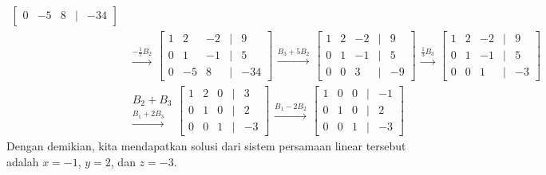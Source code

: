 \documentclass[11pt,a4paper]{article}
\begin{document}
\begin{enumerate}
\begin{align*}
\begin{bmatrix}
              0 & -5 & 8 & | & -34
          \end{bmatrix}\\
          &\begin{matrix}
            \xrightarrow{-\frac{1}{7}B_2}
          \end{matrix}
          \begin{bmatrix}
              1 & 2 & -2 & | & 9 \\
              0 & 1 & -1 & | & 5 \\
              0 & -5 & 8 & | & -34
          \end{bmatrix}
          \begin{matrix}
              \xrightarrow{B_3 + 5B_2}
          \end{matrix}
          \begin{bmatrix}
              1 & 2 & -2 & | & 9 \\
              0 & 1 & -1 & | & 5 \\
              0 & 0 & 3 & | & -9
          \end{bmatrix}
          \begin{matrix}
              \xrightarrow{\frac{1}{3}B_3}
          \end{matrix}
          \begin{bmatrix}
              1 & 2 & -2 & | & 9 \\
              0 & 1 & -1 & | & 5 \\
              0 & 0 & 1 & | & -3
          \end{bmatrix}\\
          &\begin{matrix}
              {\scriptstyle B_2 + B_3}\\
              \xrightarrow{B_1 + 2B_3}
          \end{matrix}
          \begin{bmatrix}
              1 & 2 & 0 & | & 3 \\
              0 & 1 & 0 & | & 2 \\
              0 & 0 & 1 & | & -3
          \end{bmatrix}
          \begin{matrix}
              \xrightarrow{B_1-2B_2}
          \end{matrix}
          \begin{bmatrix}
              1 & 0 & 0 & | & -1 \\
              0 & 1 & 0 & | & 2 \\
              0 & 0 & 1 & | & -3
          \end{bmatrix}
        \end{align*}
        Dengan demikian, kita mendapatkan solusi dari sistem persamaan linear tersebut adalah $x = -1$, $y = 2$, dan $z = -3$.
    \end{enumerate}
\end{document}
